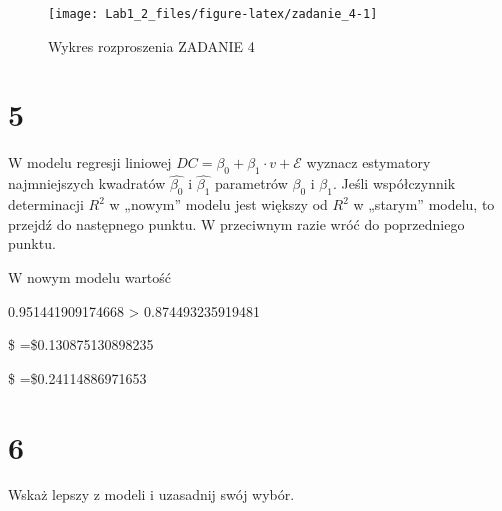 \documentclass[
  12pt,
]{article}
\newenvironment{Shaded}{\begin{snugshade}}{\end{snugshade}}
\newcommand{\DecValTok}[1]{\textcolor[rgb]{0.00,0.00,0.81}{#1}}
\newcommand{\FunctionTok}[1]{\textcolor[rgb]{0.00,0.00,0.00}{#1}}
\newcommand{\NormalTok}[1]{#1}
\newcommand{\OtherTok}[1]{\textcolor[rgb]{0.56,0.35,0.01}{#1}}
\newcommand{\SpecialCharTok}[1]{\textcolor[rgb]{0.00,0.00,0.00}{#1}}
\begin{document}
\begin{figure}[H]

{\centering \texttt{[image: Lab1\_2\_files/figure-latex/zadanie\_4-1]} 

}

\caption{\label{fig:wykres_rozrzutu_zad4}Wykres rozproszenia ZADANIE 4}\label{fig:zadanie_4}
\end{figure}

\hypertarget{section-4}{%
\section{5}\label{section-4}}

W modelu regresji liniowej
\(DC = \beta_{0} + \beta_{1} \cdot v + \mathcal{E}\) wyznacz estymatory
najmniejszych kwadratów \(\hat{\beta_{0}}\) i \(\hat{\beta_{1}}\)
parametrów \(\beta_{0}\) i \(\beta_{1}\). Jeśli współczynnik
determinacji \(R^{2}\) w „nowym'' modelu jest większy od \(R^{2}\) w
„starym'' modelu, to przejdź do następnego punktu. W przeciwnym razie
wróć do poprzedniego punktu.

\begin{Shaded}
\end{Shaded}

W nowym modelu wartość

0.951441909174668 \textgreater{} 0.874493235919481

\$ =\$0.130875130898235

\$ =\$0.24114886971653

\hypertarget{section-5}{%
\section{6}\label{section-5}}

Wskaż lepszy z modeli i uzasadnij swój wybór.
\end{document}
